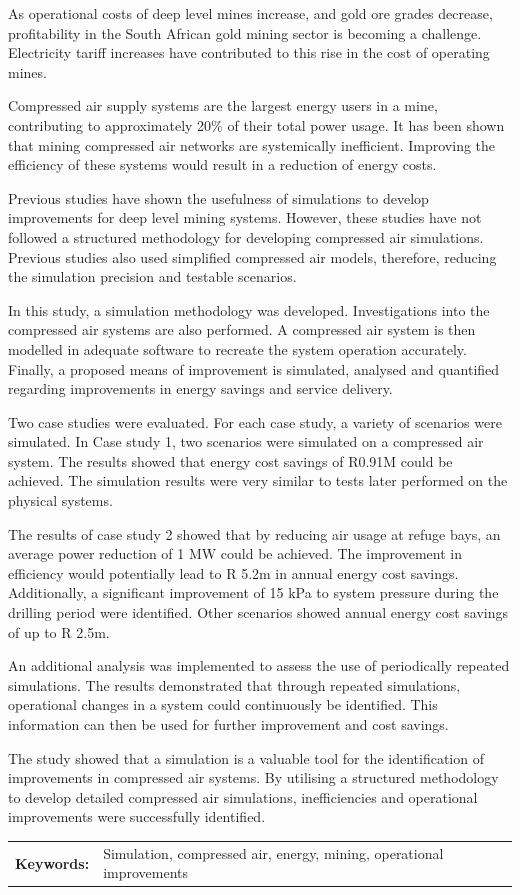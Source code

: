 \documentclass[12pt, english, oneside]{report}%
\begin{document}
As operational costs of deep level mines increase, and gold ore grades decrease, profitability in the South African gold mining sector is becoming a challenge. Electricity tariff increases have contributed to this rise in the cost of operating mines.

	 \par
Compressed air supply systems are the largest energy users in a mine, contributing to approximately 20\% of their total power usage. It has been shown that mining compressed air networks are systemically inefficient. Improving the efficiency of these systems would result in a reduction of energy costs.
	 \par
Previous studies have shown the usefulness of simulations to develop improvements for deep level mining systems. However, these studies have not followed a structured methodology for developing compressed air simulations. Previous studies also used simplified compressed air models, therefore, reducing the simulation precision and testable scenarios.

	\par
In this study, a simulation methodology was developed. Investigations into the compressed air systems are also performed. A compressed air system is then modelled in adequate software to recreate the system operation accurately. Finally, a proposed means of improvement is simulated, analysed and quantified regarding improvements in energy savings and service delivery.
	 \par
Two case studies were evaluated. For each case study, a variety of scenarios were simulated. In Case study 1, two scenarios were simulated on a compressed air system. The results showed that energy cost savings of R0.91M could be achieved. The simulation results were very similar to tests later performed on the physical systems.
	 \par 
The results of case study 2 showed that by reducing air usage at refuge bays, an average power reduction of 1 MW could be achieved. The improvement in efficiency would potentially lead to R 5.2m in annual energy cost savings. Additionally, a significant improvement of 15 kPa to system pressure during the drilling period were identified. Other scenarios showed annual energy cost savings of up to R 2.5m.
	 \par 
An additional analysis was implemented to assess the use of periodically repeated simulations. The results demonstrated that through repeated simulations, operational changes in a system could continuously be identified. This information can then be used for further improvement and cost savings.
	 \par
The study showed that a simulation is a valuable tool for the identification of improvements in compressed air systems. By utilising a structured methodology to develop detailed compressed air simulations, inefficiencies and operational improvements were successfully identified.
	 \par
	\begin{tabular}{p{}p{}}
		\textbf{Keywords:} & Simulation,  compressed air, energy, mining, operational improvements  \\
	\end{tabular}
\clearpage
\end{document}
